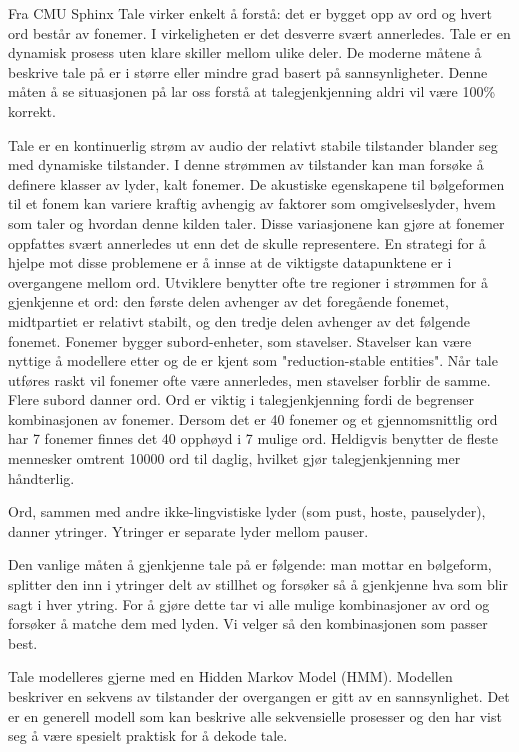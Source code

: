 {{Fra CMU Sphinx
Tale virker enkelt å forstå: det er bygget opp av ord og hvert ord består av fonemer. I virkeligheten er det desverre svært annerledes. Tale er en dynamisk prosess uten klare skiller mellom ulike deler. De moderne måtene å beskrive tale på er i større eller mindre grad basert på sannsynligheter. Denne måten å se situasjonen på lar oss forstå at talegjenkjenning aldri vil være 100\% korrekt.

Tale er en kontinuerlig strøm av audio der relativt stabile tilstander blander seg med dynamiske tilstander. I denne strømmen av tilstander kan man forsøke å definere klasser av lyder, kalt fonemer. De akustiske egenskapene til bølgeformen til et fonem kan variere kraftig avhengig av faktorer som omgivelseslyder, hvem som taler og hvordan denne kilden taler. Disse variasjonene kan gjøre at fonemer oppfattes svært annerledes ut enn det de skulle representere. 
En strategi for å hjelpe mot disse problemene er å innse at de viktigste datapunktene er i overgangene mellom ord. Utviklere benytter ofte tre regioner i strømmen for å gjenkjenne et ord: den første delen avhenger av det foregående fonemet, midtpartiet er relativt stabilt, og den tredje delen avhenger av det følgende fonemet. Fonemer bygger subord-enheter, som stavelser. Stavelser kan være nyttige å modellere etter og de er kjent som "reduction-stable entities". Når tale utføres raskt vil fonemer ofte være annerledes, men stavelser forblir de samme. Flere subord danner ord. Ord er viktig i talegjenkjenning fordi de begrenser kombinasjonen av fonemer. Dersom det er 40 fonemer og et gjennomsnittlig ord har 7 fonemer finnes det 40 opphøyd i 7 mulige ord. Heldigvis benytter de fleste mennesker omtrent 10000 ord til daglig, hvilket gjør talegjenkjenning mer håndterlig.

Ord, sammen med andre ikke-lingvistiske lyder (som pust, hoste, pauselyder), danner ytringer. Ytringer er separate lyder mellom pauser. 

Den vanlige måten å gjenkjenne tale på er følgende: man mottar en bølgeform, splitter den inn i ytringer delt av stillhet og forsøker så å gjenkjenne hva som blir sagt i hver ytring. For å gjøre dette tar vi alle mulige kombinasjoner av ord og forsøker å matche dem med lyden. Vi velger så den kombinasjonen som passer best.

Tale modelleres gjerne med en Hidden Markov Model (HMM). Modellen beskriver en sekvens av tilstander der overgangen er gitt av en sannsynlighet. Det er en generell modell som kan beskrive alle sekvensielle prosesser og den har vist seg å være spesielt praktisk for å dekode tale.

}}
